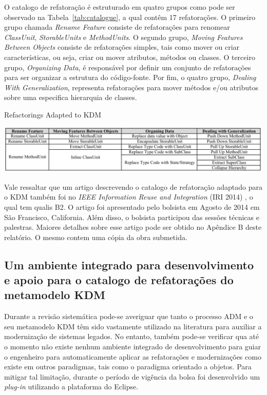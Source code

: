 O catalogo de refatoração é estruturado em quatro grupos como pode ser observado na Tabela~\ref{tab:catalogue}, a qual contêm 17 refatorações. O primeiro grupo chamada \textit{Rename Feature} consiste de refatorações para renomear \textit{ClassUnit}, \textit{StorableUnits} e \textit{MethodUnits}. O segundo grupo, \textit{Moving Features Between Objects} consiste de refatorações simples, tais como mover ou criar características, ou seja, criar ou mover atributos, métodos ou classes. O terceiro grupo,  \textit{Organizing Data}, é responsável por definir um conjunto de refatorações para ser organizar a estrutura do código-fonte. Por fim, o quatro grupo, \textit{Dealing With Generalization}, representa refatorações para mover métodos e/ou atributos sobre uma especifica hierarquia de classes. 

\begin{table}[!h]
\caption{Refactorings Adapted to KDM}
\label{tab:adaptedRefactoring}
\centering
  \includegraphics[scale=0.67]{figuras/NovoCatalogue}
\end{table}

Vale ressaltar que um artigo descrevendo o catalogo de refatoração adaptado para o KDM também foi no \textit{IEEE Information Reuse and Integration} (IRI 2014) , o qual tem qualis B2. O artigo foi apresentado pelo bolsista em Agosto de 2014 em São Francisco, California. Além disso, o bolsista participou das sessões técnicas e palestras. Maiores detalhes sobre esse artigo pode ser obtido no Apêndice B deste relatório. O mesmo contem uma cópia da obra submetida.

\subsection{Um ambiente integrado para desenvolvimento e apoio para o catalogo de refatorações do metamodelo KDM}

Durante a revisão sistemática pode-se averiguar que tanto o processo ADM e o seu metamodelo KDM têm sido vastamente utilizado na literatura para auxiliar a modernização de sistemas legados. No entanto, também pode-se verificar qua até o momento não existe nenhum ambiente integrado de desenvolvimento para guiar o engenheiro para automaticamente aplicar as refatorações e modernizações como existe em outros paradigmas, tais como o paradigma orientado a objetos. Para mitigar tal limitação, durante o período de vigência da bolsa foi desenvolvido um \textit{plug-in} utilizando a plataforma do Eclipse. 

